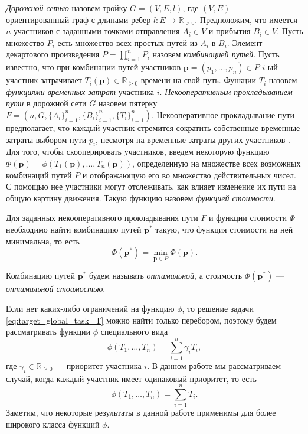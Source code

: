 \documentclass[12pt, a4paper]{article}
\DeclareMathOperator*{\minn}{min}
\begin{document}
\textit {Дорожной сетью} назовем тройку $G = (V, E, l)$, где $(V, E)$ --- ориентированный граф с длинами ребер $l: E \rightarrow \mathbb{R}_{>0} $.  Предположим, что имеется $n$ участников с заданными точками отправления $A_i \in V$ и прибытия $B_i \in V$. Пусть множество $P_i$ есть множество всех простых путей из $A_i$ в $B_i$. Элемент декартового произведения ${P = \prod \limits_{i = 1} ^ n P_i}$ назовем \textit{комбинацией путей}. Пусть известно, что при комбинации путей участников $\textbf{p} = \left(p_1, \ldots, p_n\right)\in P$ $i$-ый участник затрачивает $T_i(\textbf{p}) \in \mathbb{R}_{\ge 0}$ времени на свой путь. 
Функции $T_i$ назовем \textit{функциями временных затрат} участника $i$.
\textit{Некооперативным прокладыванием пути} в дорожной сети $G$ назовем пятерку $F = (n, G, \{A_i\}_{i = 1}^{n}, \{B_i\}_{i = 1}^{n}, \{T_i\}_{i = 1}^{n})$. Некооперативное прокладывание пути предполагает, что каждый участник стремится сократить собственные временные затраты выбором пути $p_i$, несмотря на временные затраты других участников \cite{teor_igri}. 
Для того, чтобы скооперировать участников, введем некоторую функцию $\Phi (\textbf{p}) = \phi (T_1 (\textbf{p}), \ldots, T_n(\textbf{p}))$, определенную на множестве всех возможных комбинаций путей $P$ и отображающую его во множество действительных чисел. С помощью нее участники могут отслеживать, как влияет изменение их пути на общую картину движения. Такую функцию назовем \textit{функцией стоимости}.

Для заданных некооперативного прокладывания пути $F$ и функции стоимости $\Phi$ необходимо найти комбинацию путей $\textbf{p}^*$ такую, что функция стоимости на ней минимальна, то есть
\begin{equation}
	\label{eq:target_global_task_T} 
	\Phi (\textbf{p}^*) = \minn\limits_{ \textbf{p} \in P} \Phi (\textbf{p}).
\end{equation}

Комбинацию путей $\textbf{p}^*$ будем называть \textit {оптимальной}, а стоимость  $ \Phi (\textbf{p}^*)$ --- \textit{оптимальной стоимостью}.

Если нет каких-либо ограничений на функцию $\phi$, то решение задачи \eqref{eq:target_global_task_T} можно найти только перебором, поэтому будем рассматривать функции $\phi$ специального вида $$\phi(T_1, \ldots, T_n) = \sum\limits_{i = 1}^n \gamma_iT_i,$$ где $\gamma_i \in \mathbb{R}_{\ge 0}$ --- приоритет участника $i$. В данном работе мы рассматриваем случай, когда каждый участник имеет одинаковый приоритет, то есть 
\begin{equation}
\label{target_f}
\phi(T_1, \ldots, T_n) = \sum\limits_{i = 1}^nT_i.
\end{equation}
Заметим, что некоторые результаты в данной работе применимы для более широкого класса функций $\phi$. 
\end{document}
